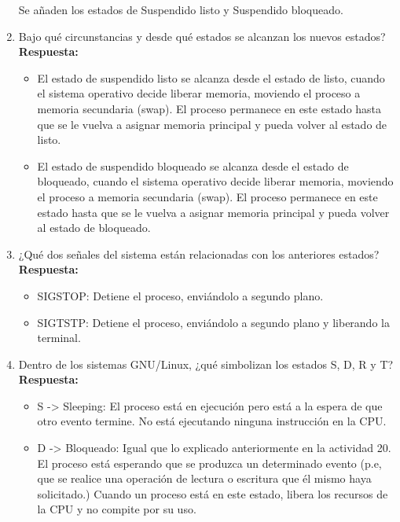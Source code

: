 \documentclass[a4paper,12pt]{article}
\begin{document}
\begin{enumerate}[label=\textbf{Pregunta \arabic*.}]
    Se añaden los estados de Suspendido listo y Suspendido bloqueado.
    \newpage
    \item Bajo qué circunstancias y desde qué estados se alcanzan los nuevos estados? \\ %
    \textbf{Respuesta:} 
    
    \begin{itemize}
        
    \item El estado de suspendido listo se alcanza desde el estado de listo, cuando el sistema operativo decide liberar memoria, moviendo el proceso a memoria secundaria (swap). El proceso permanece en este estado hasta que se le vuelva a asignar memoria principal y pueda volver al estado de listo.

    \item El estado de suspendido bloqueado se alcanza desde el estado de bloqueado, cuando el sistema operativo decide liberar memoria, moviendo el proceso a memoria secundaria (swap). El proceso permanece en este estado hasta que se le vuelva a asignar memoria principal y pueda volver al estado de bloqueado.

    \end{itemize}


    \item ¿Qué dos señales del sistema están relacionadas con los anteriores estados? \\ %
    \textbf{Respuesta:} 
    
    \begin{itemize}
        \item SIGSTOP: Detiene el proceso, enviándolo a segundo plano.
        \item SIGTSTP: Detiene el proceso, enviándolo a segundo plano y liberando la terminal.
    \end{itemize}


    \item Dentro de los sistemas GNU/Linux, ¿qué simbolizan los estados S, D, R y T? \\ %
    \textbf{Respuesta:} 
    
    \begin{itemize}
        \item S -> Sleeping: El proceso está en ejecución pero está a la espera de que otro evento termine. No está ejecutando ninguna instrucción en la CPU.

        \item D -> Bloqueado: Igual que lo explicado anteriormente en la actividad 20. El proceso está esperando que se produzca un determinado evento (p.e, que se realice una operación de lectura o escritura que él mismo haya solicitado.) Cuando un proceso está en este estado, libera los recursos de la CPU y no compite por su uso.


\end{itemize}
\end{enumerate}
\end{document}
